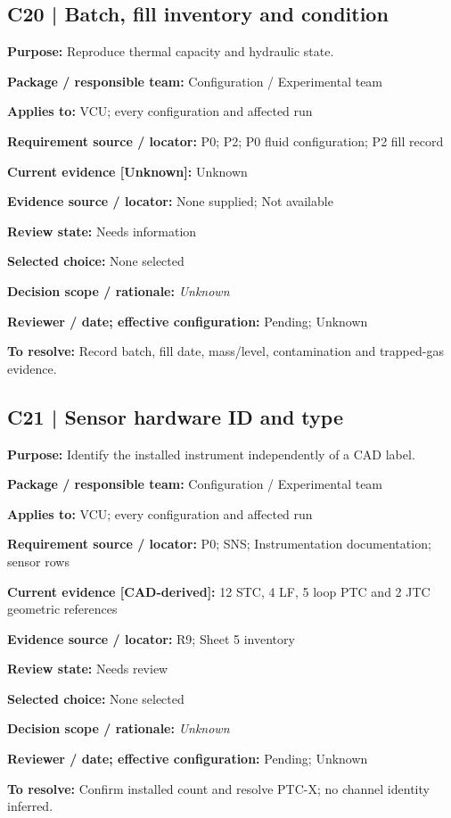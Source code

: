 \documentclass[11pt]{article}
\begin{document}
\begin{minipage}{\textwidth}\small\setlength{\parskip}{2pt}
\subsection*{C20 | Batch, fill inventory and condition}
\textbf{Purpose:} Reproduce thermal capacity and hydraulic state.\par
\textbf{Package / responsible team:} Configuration / Experimental team\par
\textbf{Applies to:} VCU; every configuration and affected run\par
\textbf{Requirement source / locator:} P0; P2; P0 fluid configuration; P2 fill record\par
\textbf{Current evidence [Unknown]:} Unknown\par
\textbf{Evidence source / locator:} None supplied; Not available\par
\textbf{Review state:} Needs information\par
\textbf{Selected choice:} None selected\par
\textbf{Decision scope / rationale:} \textit{Unknown}\par
\textbf{Reviewer / date; effective configuration:} Pending; Unknown\par
\textbf{To resolve:} Record batch, fill date, mass/level, contamination and trapped-gas evidence.\par
\end{minipage}\par\vspace{5pt}
\begin{minipage}{\textwidth}\small\setlength{\parskip}{2pt}
\subsection*{C21 | Sensor hardware ID and type}
\textbf{Purpose:} Identify the installed instrument independently of a CAD label.\par
\textbf{Package / responsible team:} Configuration / Experimental team\par
\textbf{Applies to:} VCU; every configuration and affected run\par
\textbf{Requirement source / locator:} P0; SNS; Instrumentation documentation; sensor rows\par
\textbf{Current evidence [CAD-derived]:} 12 STC, 4 LF, 5 loop PTC and 2 JTC geometric references\par
\textbf{Evidence source / locator:} R9; Sheet 5 inventory\par
\textbf{Review state:} Needs review\par
\textbf{Selected choice:} None selected\par
\textbf{Decision scope / rationale:} \textit{Unknown}\par
\textbf{Reviewer / date; effective configuration:} Pending; Unknown\par
\textbf{To resolve:} Confirm installed count and resolve PTC-X; no channel identity inferred.\par
\end{minipage}\par\vspace{5pt}
\end{document}
